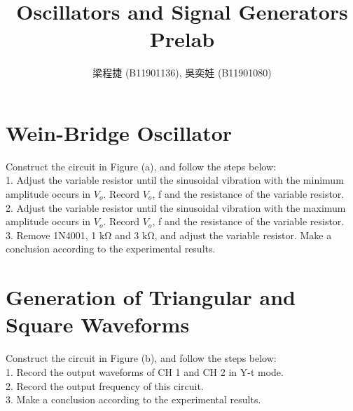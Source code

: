 \documentclass{article}
\title{Oscillators and Signal Generators Prelab}
\author{梁程捷 (B11901136), 吳奕娃 (B11901080)}
\date{}
\begin{document}
\begin{CJK*}{UTF8}{bkai}

\maketitle

\section{Wein-Bridge Oscillator}
Construct the circuit in Figure (a), and follow the steps below: \\
1. Adjust the variable resistor until the sinusoidal vibration with the minimum amplitude occurs in $V_o$. Record $V_o$, f and the resistance of the variable resistor.\\
2. Adjust the variable resistor until the sinusoidal vibration with the maximum amplitude occurs in $V_o$. Record $V_o$, f and the resistance of the variable resistor. \\
3. Remove 1N4001, 1 \unit{\kilo\ohm}  and 3 \unit{\kilo\ohm}, and adjust the variable resistor. Make a conclusion according to the experimental results. \\

\section{Generation of Triangular and Square Waveforms}
Construct the circuit in Figure (b), and follow the steps below: \\
1. Record the output waveforms of CH 1 and CH 2 in Y-t mode. \\
2. Record the output frequency of this circuit. \\
3. Make a conclusion according to the experimental results. \\


\end{CJK*}
\end{document}
